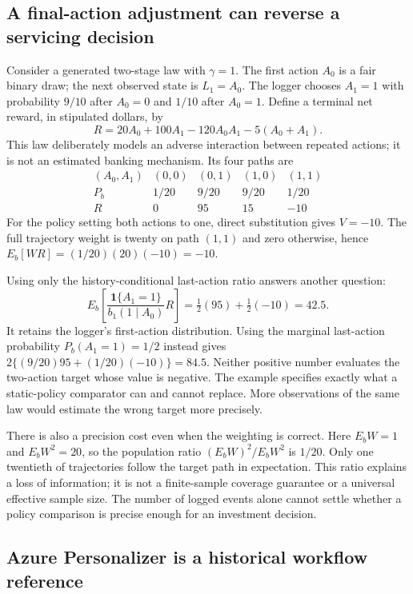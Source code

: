 \subsection{A final-action adjustment can reverse a servicing decision}

Consider a generated two-stage law with $\gamma=1$. The first action $A_0$ is a fair binary
draw; the next observed state is $L_1=A_0$. The logger chooses $A_1=1$ with
probability $9/10$ after $A_0=0$ and $1/10$ after $A_0=1$. Define a terminal
net reward, in stipulated dollars, by
\[
 R=20A_0+100A_1-120A_0A_1-5(A_0+A_1).
\]
This law deliberately models an adverse interaction between repeated actions;
it is not an estimated banking mechanism. Its four paths are
\[
 \begin{array}{c|rrrr}
 (A_0,A_1)&(0,0)&(0,1)&(1,0)&(1,1)\\\hline
 P_b&1/20&9/20&9/20&1/20\\
 R&0&95&15&-10
 \end{array}
\]
For the policy setting both actions to one, direct substitution gives
$V=-10$. The full trajectory weight is twenty on path $(1,1)$ and zero
otherwise, hence $E_b[WR]=(1/20)(20)(-10)=-10$.
\citep{exec16_cp_exact}

Using only the history-conditional last-action ratio answers another question:
\[
 E_b\left[\frac{\mathbf1\{A_1=1\}}{b_1(1\mid A_0)}R\right]
 =\tfrac12(95)+\tfrac12(-10)=42.5.
\]
It retains the logger's first-action distribution. Using the marginal
last-action probability $P_b(A_1=1)=1/2$ instead gives
$2\{(9/20)95+(1/20)(-10)\}=84.5$. Neither positive number evaluates the
two-action target whose value is negative. The example specifies exactly
what a static-policy comparator can and cannot replace. More observations
of the same law would estimate the wrong target more precisely.
\citep{exec16_cp_exact}

There is also a precision cost even when the weighting is correct. Here
$E_bW=1$ and $E_bW^2=20$, so the population ratio
$(E_bW)^2/E_bW^2$ is $1/20$. Only one twentieth of trajectories follow
the target path in expectation. This ratio explains a loss of information;
it is not a finite-sample coverage guarantee or a universal effective sample
size. The number of logged events alone cannot settle whether a policy
comparison is precise enough for an investment decision.
\citep{exec16_cp_exact}

\subsection{Azure Personalizer is a historical workflow reference}


